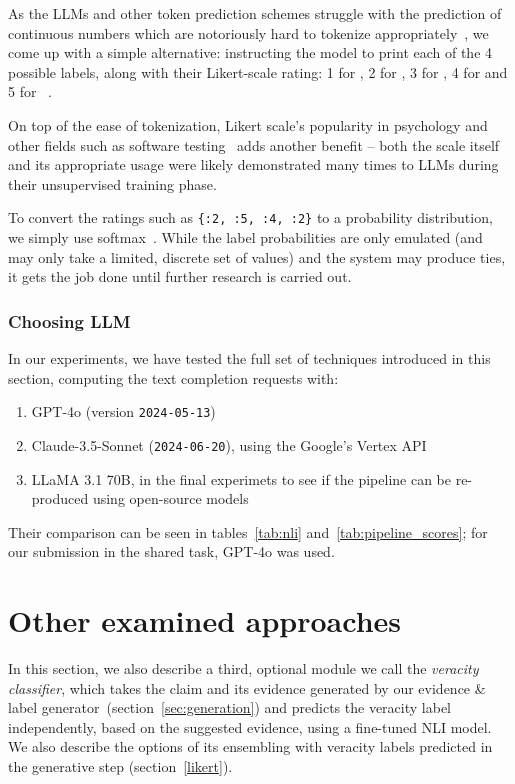 As the LLMs and other token prediction schemes struggle with the prediction of continuous numbers which are notoriously hard to tokenize appropriately~\cite{golkar2023xvalcontinuousnumberencoding}, we come up with a simple alternative: instructing the model to print each of the 4 possible labels, along with their Likert-scale rating: 1 for , 2 for , 3 for , 4 for  and 5 for ~\cite{likert1932technique}.

On top of the ease of tokenization, Likert scale's popularity in psychology and other fields such as software testing~\cite{likertstudy} adds another benefit -- both the scale itself and its appropriate usage were likely demonstrated many times to LLMs during their unsupervised training phase.

To convert the ratings such as \texttt{\{:2, :5, :4, :2\}} to a probability distribution, we simply use softmax~\cite{NIPS1989_0336dcba}.
While the label probabilities are only emulated (and may only take a limited, discrete set of values) and the system may produce ties, it gets the job done until further research is carried out.

\subsubsection{Choosing LLM}
\label{sec:chosen_llms}
In our experiments, we have tested the full set of techniques introduced in this section, computing the text completion requests with:
\begin{enumerate}
    \item GPT-4o (version \texttt{2024-05-13})
    \item Claude-3.5-Sonnet (\texttt{2024-06-20}), using the Google's Vertex API
    \item LLaMA 3.1 70B, in the final experimets to see if the pipeline can be re-produced using open-source models
\end{enumerate} 

Their comparison can be seen in tables~\ref{tab:nli} and~\ref{tab:pipeline_scores}; for our submission in the \averitec{}  shared task, GPT-4o was used.

\section{Other examined approaches}
\label{sec:failed}
In this section, we also describe a third, optional module we call the \textit{veracity classifier}, which takes the claim and its evidence generated by our evidence \& label generator~(section~\ref{sec:generation}) and predicts the veracity label independently, based on the suggested evidence, using a fine-tuned NLI model.
We also describe the options of its ensembling with veracity labels predicted in the generative step (section~\ref{likert}).

